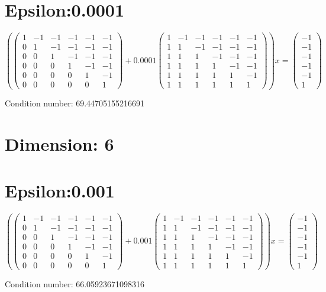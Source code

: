 \documentclass{article}%
\begin{document}
\section{Epsilon:0.0001}%
\label{sec:Epsilon0.0001}%
\[%
( \begin{pmatrix}%
1&-1&-1&-1&-1&-1\\%
0&1&-1&-1&-1&-1\\%
0&0&1&-1&-1&-1\\%
0&0&0&1&-1&-1\\%
0&0&0&0&1&-1\\%
0&0&0&0&0&1%
\end{pmatrix} + 0.0001 \begin{pmatrix}%
1&-1&-1&-1&-1&-1\\%
1&1&-1&-1&-1&-1\\%
1&1&1&-1&-1&-1\\%
1&1&1&1&-1&-1\\%
1&1&1&1&1&-1\\%
1&1&1&1&1&1%
\end{pmatrix} )x = \begin{pmatrix}%
-1\\%
-1\\%
-1\\%
-1\\%
-1\\%
1%
\end{pmatrix}%
\]%
\begin{Large}%
Condition number:%
69.44705155216691%
\end{Large}

%
\section{Dimension: 6}%
\label{sec:Dimension6}%
\section{Epsilon:0.001}%
\label{sec:Epsilon0.001}%
\[%
( \begin{pmatrix}%
1&-1&-1&-1&-1&-1\\%
0&1&-1&-1&-1&-1\\%
0&0&1&-1&-1&-1\\%
0&0&0&1&-1&-1\\%
0&0&0&0&1&-1\\%
0&0&0&0&0&1%
\end{pmatrix} + 0.001 \begin{pmatrix}%
1&-1&-1&-1&-1&-1\\%
1&1&-1&-1&-1&-1\\%
1&1&1&-1&-1&-1\\%
1&1&1&1&-1&-1\\%
1&1&1&1&1&-1\\%
1&1&1&1&1&1%
\end{pmatrix} )x = \begin{pmatrix}%
-1\\%
-1\\%
-1\\%
-1\\%
-1\\%
1%
\end{pmatrix}%
\]%
\begin{Large}%
Condition number:%
66.05923671098316%
\end{Large}

%
\end{document}
